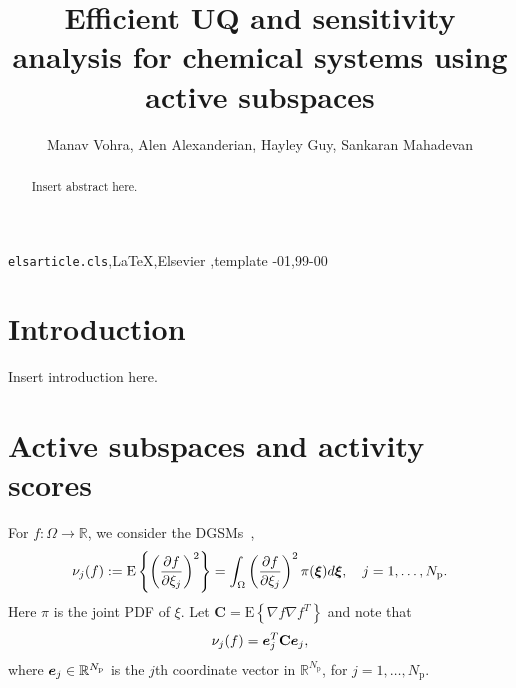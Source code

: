 \documentclass[1pt]{elsarticle}
\renewcommand{\vec}[1]{{\mathchoice
                     {\mbox{\boldmath$\displaystyle{#1}$}}
                     {\mbox{\boldmath$\textstyle{#1}$}}
                     {\mbox{\boldmath$\scriptstyle{#1}$}}
                     {\mbox{\boldmath$\scriptscriptstyle{#1}$}}}}
\newcommand{\R}{\mathbb{R}}
\newcommand{\mat}[1]{\mathbf{{#1}}}
\newcommand{\Np}{{N_\text{p}}}
\newcommand{\E}[1]{\mathrm{E}\left\{{#1} \right\}}
\begin{document}
\begin{frontmatter}

\title{Efficient UQ and sensitivity analysis for chemical systems using active 
subspaces}

\author{Manav Vohra, Alen Alexanderian, Hayley Guy, Sankaran Mahadevan}
\address{Vanderbilt, NCSU}




\begin{abstract}
Insert abstract here.
\end{abstract}

\begin{keyword}
\texttt{elsarticle.cls}\sep \LaTeX\sep Elsevier \sep template
-01\sep  99-00
\end{keyword}

\end{frontmatter}


\section{Introduction}
Insert introduction here.

\section{Active subspaces and activity scores}
For $f: \Omega \to \R$, we consider the DGSMs~\cite{SobolKucherenko09},
\[
    \nu_j(f) := \E{\left(\frac{\partial f}{\partial\xi_j}\right)^2} =
                  \int_\Omega 
                  \left(\frac{\partial f}{\partial\xi_j}\right)^2
                  \pi(\vec{\xi})d\vec{\xi}, \quad j = 1, \ldots, \Np.   
\]
Here $\pi$ is the joint PDF of $\xi$. 
Let $\mat{C} = \E{\nabla f \nabla f^T}$ and note that
\[
   \nu_j(f) = \vec{e}_j^T \mat{C} \vec{e}_j, 
\]
where $\vec{e}_j \in \R^\Np$ is the $j$th coordinate vector in $\R^\Np$,
for $j = 1, \ldots, \Np$.
\end{document}
